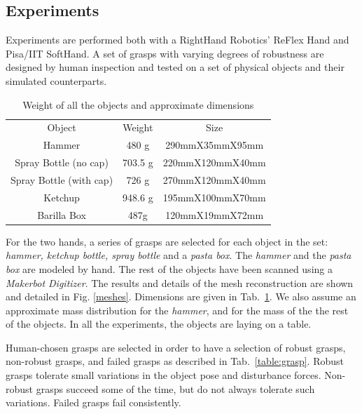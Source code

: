\subsection{Experiments}
\label{experiments5}

Experiments are performed both with a RightHand Robotics' ReFlex Hand and Pisa/IIT SoftHand.  A set of grasps with varying degrees of robustness are designed by human inspection and tested on a set of physical objects and their simulated counterparts.

\begin{table}[hbt]
   \begin{center}
   \begin{tabular}{| c | c | c |}
   \hline
   Object & Weight & Size \\
   \cline{1-3}
   Hammer                   & 480 g     & 290mmX35mmX95mm      \\\hline
   Spray Bottle (no cap)    & 703.5 g   & 220mmX120mmX40mm      \\\hline
   Spray Bottle (with cap)  & 726 g     & 270mmX120mmX40mm      \\\hline
   Ketchup              & 948.6 g   & 195mmX100mmX70mm   \\\hline
   Barilla Box              & 487g      & 120mmX19mmX72mm      \\\hline
   \end{tabular}
   \end{center}
   \caption{Weight of all the objects and approximate dimensions}
   \label{table:object}
\end{table}


For the two hands, a series of grasps are selected for each object in the set:
\emph{hammer, ketchup bottle, spray bottle} and a \emph{pasta box}.
The \emph{hammer} and the \emph{pasta box} are modeled by hand. The rest of the objects have been scanned using a \emph{Makerbot Digitizer}. The results and details of the mesh reconstruction are shown and detailed in Fig. \ref{meshes}.
Dimensions are given in Tab.~\ref{table:object}.
We also assume an approximate mass distribution for the \emph{hammer}, and for the mass of the the rest of the objects.
In all the experiments, the objects are laying on a table.


Human-chosen grasps are selected in order to have a selection of robust grasps, non-robust grasps, and failed grasps as described in Tab.~\ref{table:grasp}. Robust grasps tolerate small variations in the object pose and disturbance forces. Non-robust grasps succeed some of the time, but do not always tolerate such variations.  Failed grasps fail consistently.  

